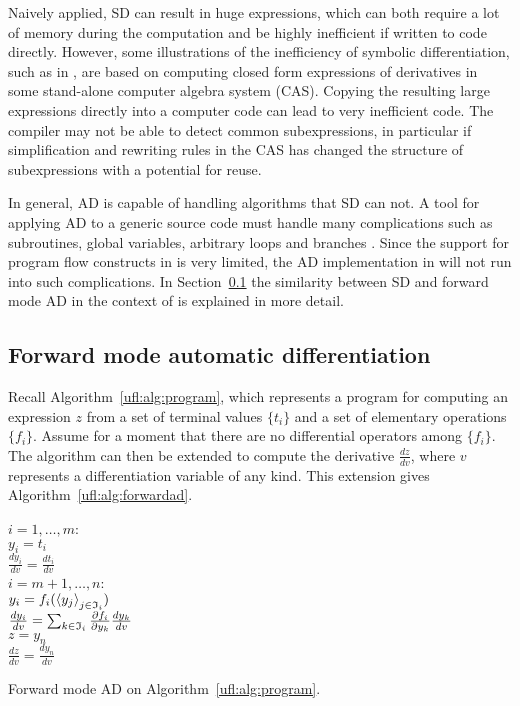 Naively applied, SD can result in huge expressions, which can both require
a lot of memory during the computation and be highly inefficient if
written to code directly. However, some illustrations of the inefficiency
of symbolic differentiation, such as in \citet{Griewank1989}, are based
on computing closed form expressions of derivatives in some stand-alone
computer algebra system (CAS).  Copying the resulting large expressions
directly into a computer code can lead to very inefficient code. The
compiler may not be able to detect common subexpressions, in particular
if simplification and rewriting rules in the CAS has changed the structure
of subexpressions with a potential for reuse.

In general, AD is capable of handling algorithms that SD can not.  A tool
for applying AD to a generic source code must handle many complications
such as subroutines, global variables, arbitrary loops and branches
\citep{BischofCarleCorlissEtAl1992,BischofHovlandNorris2002,GieringKaminski1998}.
Since the support for program flow constructs in \ufl{} is very limited,
the AD implementation in \ufl{} will not run into such complications.
In Section~\ref{ufl:sec:forwardad} the similarity between SD and forward
mode AD in the context of \ufl{} is explained in more detail.

\subsection{Forward mode automatic differentiation}
\label{ufl:sec:forwardad}

Recall Algorithm~\ref{ufl:alg:program}, which represents a program for
computing an expression $z$ from a set of terminal values $\{ t_i \}$
and a set of elementary operations $\{ f_i \}$. Assume for a moment that
there are no differential operators among $\{ f_i \}$.  The algorithm
can then be extended to compute the derivative $\frac{d z}{d
  v}$, where $v$ represents a differentiation variable of any kind.
This extension gives Algorithm~\ref{ufl:alg:forwardad}.

\begin{algorithm}
\afor $i = 1, \ldots, m$:\\
\tab $y_i = t_i$ \\
\tab $\frac{d y_i}{d v} = \frac{d t_i}{d v}$ \\
\afor $i = m+1, \ldots, n$:\\
\tab $y_i = f_i(\left\langle{y_j}\right\rangle_{j\in\mathfrak{I}_i})$ \\
\tab $\frac{d y_i}{d v} = \sum_{k\in\mathfrak{I}_i} \frac{\partial f_i}{\partial y_k} \frac{d y_k}{d v}$ \\
$z = y_n$ \\
$\frac{d z}{d v} = \frac{d y_n}{d v}$
\caption{Forward mode AD on Algorithm~\ref{ufl:alg:program}.}
\label{ufl:alg:forwardad}
\end{algorithm}

